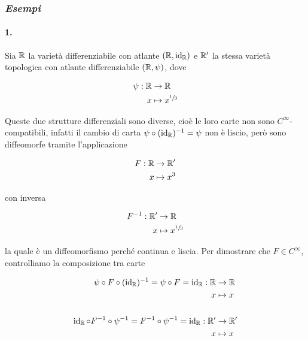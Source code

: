 \subsubsection{\textit{Esempi}}

\paragraph{1.}

Sia $ \mathbb{R} $ la varietà differenziabile con atlante $ (\mathbb{R},\operatorname{id}_{\mathbb{R}}) $ e $ \mathbb{R}' $ la stessa varietà topologica con atlante differenziabile $ (\mathbb{R},\psi) $, dove

\begin{align}
	\begin{split}
		\psi : \mathbb{R} &\to \mathbb{R}\\
		x &\mapsto x^{\sfrac{1}{3}}
	\end{split}	
\end{align}

Queste due strutture differenziali sono diverse, cioè le loro carte non sono $ C^{\infty} $-compatibili, infatti il cambio di carta $ \psi \circ (\operatorname{id}_{\mathbb{R}})^{-1} = \psi $ non è liscio, però sono diffeomorfe tramite l'applicazione

\begin{align}
	\begin{split}
		F : \mathbb{R} &\to \mathbb{R}'\\
		x &\mapsto x^{3}
	\end{split}	
\end{align}

con inversa

\begin{align}
	\begin{split}
		F^{-1} : \mathbb{R}' &\to \mathbb{R}\\
		x &\mapsto x^{\sfrac{1}{3}}
	\end{split}	
\end{align}

la quale è un diffeomorfismo perché continua e liscia. Per dimostrare che $ F \in C^{\infty} $, controlliamo la composizione tra carte

\begin{align}
	\begin{split}
		\psi \circ F \circ (\operatorname{id}_{\mathbb{R}})^{-1} = \psi \circ F = \operatorname{id}_{\mathbb{R}} : \mathbb{R} &\to \mathbb{R}\\
		x &\mapsto x\\\\
		\operatorname{id}_{\mathbb{R}} \circ F^{-1} \circ \psi^{-1} = F^{-1} \circ \psi^{-1} = \operatorname{id}_{\mathbb{R}} : \mathbb{R}' &\to \mathbb{R}'\\
		x &\mapsto x
	\end{split}	
\end{align}


